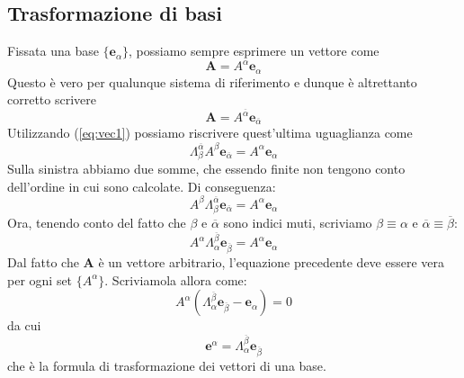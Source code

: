 \documentclass[a4paper,11pt]{book}
\theoremstyle{plain}
\theoremstyle{definition}
\begin{document}
\subsection{Trasformazione di basi}
Fissata una base $\{ \textbf{e}_{\alpha} \}$, possiamo sempre esprimere un vettore come
\[
\textbf{A} = A^{\alpha} \textbf{e}_{\alpha}
\]
Questo è vero per qualunque sistema di riferimento e dunque è altrettanto corretto scrivere
\[
\textbf{A} = A^{\overline{\alpha}} \textbf{e}_{\overline{\alpha}}
\]
Utilizzando (\ref{eq:vec1}) possiamo riscrivere quest'ultima uguaglianza come
\[
\Lambda _{\beta}^{\overline{\alpha}}A^{\beta}\textbf{e}_{\overline{\alpha}} = A^{\alpha}\textbf{e}_{\alpha}
\]
Sulla sinistra abbiamo due somme, che essendo finite non tengono conto dell'ordine in cui sono calcolate. Di conseguenza:
\[
A^{\beta}\Lambda _{\beta}^{\overline{\alpha}}\textbf{e}_{\overline{\alpha}} = A^{\alpha}\textbf{e}_{\alpha}
\]
Ora, tenendo conto del fatto che $\beta$ e $\overline{\alpha}$ sono indici muti, scriviamo $\beta \equiv \alpha$ e $\overline{\alpha} \equiv \overline{\beta}$:
\[
A^{\alpha}\Lambda _{\alpha}^{\overline{\beta}}\textbf{e}_{\overline{\beta}} = A^{\alpha}\textbf{e}_{\alpha}
\]
Dal fatto che $\textbf{A}$ è un vettore arbitrario, l'equazione precedente deve essere vera per ogni set $\{ A^{\alpha} \}$. Scriviamola allora come:
\[
A^{\alpha} (  \Lambda _{\alpha}^{\overline{\beta}}\textbf{e}_{\overline{\beta}} -\textbf{e}_{\alpha}) =0
\]
da cui
\begin{equation}\label{eq:vec2}
\textbf{e}^{\alpha} = \Lambda _{\alpha}^{\overline{\beta}}\textbf{e}_{\overline{\beta}}
\end{equation}
che è la formula di trasformazione dei vettori di una base. 
\end{document}
